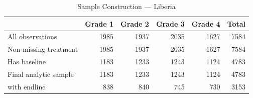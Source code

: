 \begin{table}[htbp]
\centering
\small
\caption{Sample Construction --- Liberia}
\label{tab:lib_sampleflow}
\begin{tabular}{l*{5}{r}}
\toprule
 & Grade 1 & Grade 2 & Grade 3 & Grade 4 & Total \\
\midrule
All observations & 1985 & 1937 & 2035 & 1627 & 7584 \\
Non-missing treatment & 1985 & 1937 & 2035 & 1627 & 7584 \\
Has baseline & 1183 & 1233 & 1243 & 1124 & 4783 \\
Final analytic sample & 1183 & 1233 & 1243 & 1124 & 4783 \\
\quad with endline & 838 & 840 & 745 & 730 & 3153 \\
\bottomrule
\end{tabular}
\end{table}